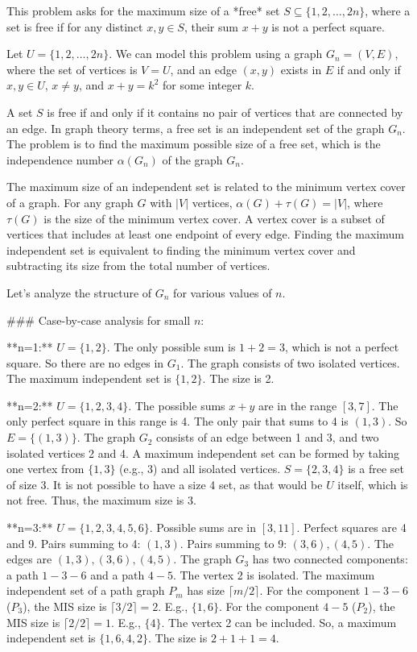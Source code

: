 This problem asks for the maximum size of a *free* set $S \subseteq \{1, 2, \dots, 2n\}$, where a set is free if for any distinct $x, y \in S$, their sum $x+y$ is not a perfect square.

Let $U = \{1, 2, \dots, 2n\}$. We can model this problem using a graph $G_n=(V,E)$, where the set of vertices is $V=U$, and an edge $(x,y)$ exists in $E$ if and only if $x, y \in U$, $x \neq y$, and $x+y=k^2$ for some integer $k$.

A set $S$ is free if and only if it contains no pair of vertices that are connected by an edge. In graph theory terms, a free set is an independent set of the graph $G_n$. The problem is to find the maximum possible size of a free set, which is the independence number $\alpha(G_n)$ of the graph $G_n$.

The maximum size of an independent set is related to the minimum vertex cover of a graph. For any graph $G$ with $|V|$ vertices, $\alpha(G) + \tau(G) = |V|$, where $\tau(G)$ is the size of the minimum vertex cover. A vertex cover is a subset of vertices that includes at least one endpoint of every edge. Finding the maximum independent set is equivalent to finding the minimum vertex cover and subtracting its size from the total number of vertices.

Let's analyze the structure of $G_n$ for various values of $n$.

### Case-by-case analysis for small $n$:

**n=1:** $U=\{1,2\}$. The only possible sum is $1+2=3$, which is not a perfect square. So there are no edges in $G_1$. The graph consists of two isolated vertices. The maximum independent set is $\{1,2\}$. The size is 2.

**n=2:** $U=\{1,2,3,4\}$. The possible sums $x+y$ are in the range $[3, 7]$. The only perfect square in this range is 4. The only pair that sums to 4 is $(1,3)$. So $E=\{(1,3)\}$. The graph $G_2$ consists of an edge between 1 and 3, and two isolated vertices 2 and 4. A maximum independent set can be formed by taking one vertex from $\{1,3\}$ (e.g., 3) and all isolated vertices. $S=\{2,3,4\}$ is a free set of size 3. It is not possible to have a size 4 set, as that would be $U$ itself, which is not free. Thus, the maximum size is 3.

**n=3:** $U=\{1,2,3,4,5,6\}$. Possible sums are in $[3,11]$. Perfect squares are 4 and 9.
Pairs summing to 4: $(1,3)$.
Pairs summing to 9: $(3,6), (4,5)$.
The edges are $(1,3), (3,6), (4,5)$. The graph $G_3$ has two connected components: a path $1-3-6$ and a path $4-5$. The vertex 2 is isolated.
The maximum independent set of a path graph $P_m$ has size $\lceil m/2 \rceil$.
For the component $1-3-6$ ($P_3$), the MIS size is $\lceil 3/2 \rceil=2$. E.g., $\{1,6\}$.
For the component $4-5$ ($P_2$), the MIS size is $\lceil 2/2 \rceil=1$. E.g., $\{4\}$.
The vertex 2 can be included.
So, a maximum independent set is $\{1,6,4,2\}$. The size is $2+1+1=4$.

